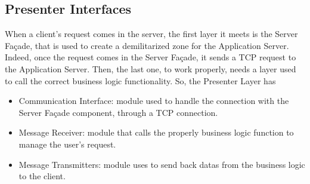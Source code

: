 \subsection*{Presenter Interfaces}
When a client's request comes in the server, the first layer it meets is the Server Façade, that is used to create a demilitarized zone for the Application Server. Indeed, once the request comes in the Server Façade, it sends a TCP request to the Application Server. Then, the last one, to work properly, needs a layer used to call the correct business logic functionality. So, the Presenter Layer has
\begin{itemize}
    \item Communication Interface: module used to handle the connection with the Server Façade component, through a TCP connection.
    \item Message Receiver: module that calls the properly business logic function to manage the user's request.
    \item Message Transmitters: module uses to send back datas from the business logic to the client.
\end{itemize}


